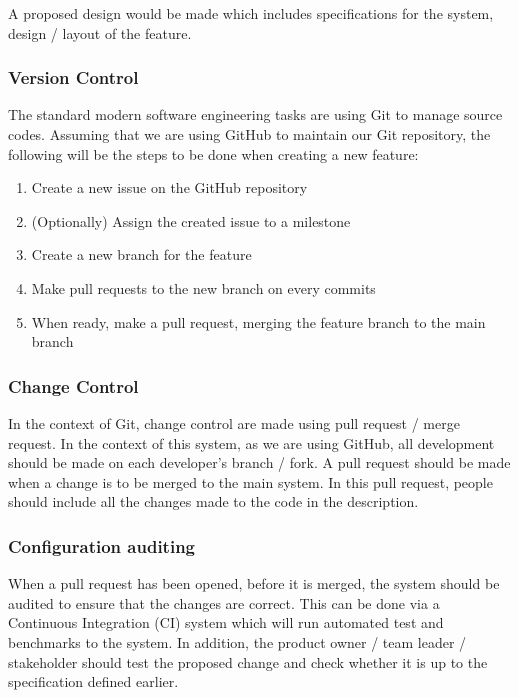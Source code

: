 \documentclass[
  11pt, %
]{assignment}
\begin{document}
A proposed design would be made which includes specifications for the system, design / layout of the feature.

\subsubsection*{Version Control}

The standard modern software engineering tasks are using Git to manage source codes. Assuming that we are using GitHub to maintain our Git repository, the following will be the steps to be done when creating a new feature:

\begin{enumerate}
  \item Create a new issue on the GitHub repository
  \item (Optionally) Assign the created issue to a milestone
  \item Create a new branch for the feature
  \item Make pull requests to the new branch on every commits
  \item When ready, make a pull request, merging the feature branch to the main branch
\end{enumerate}

\subsubsection*{Change Control}

In the context of Git, change control are made using pull request / merge request. In the context of this system, as we are using GitHub, all development should be made on each developer's branch / fork. A pull request should be made when a change is to be merged to the main system. In this pull request, people should include all the changes made to the code in the description.

\subsubsection*{Configuration auditing}

When a pull request has been opened, before it is merged, the system should be audited to ensure that the changes are correct. This can be done via a Continuous Integration (CI) system which will run automated test and benchmarks to the system. In addition, the product owner / team leader / stakeholder should test the proposed change and check whether it is up to the specification defined earlier.
\end{document}

